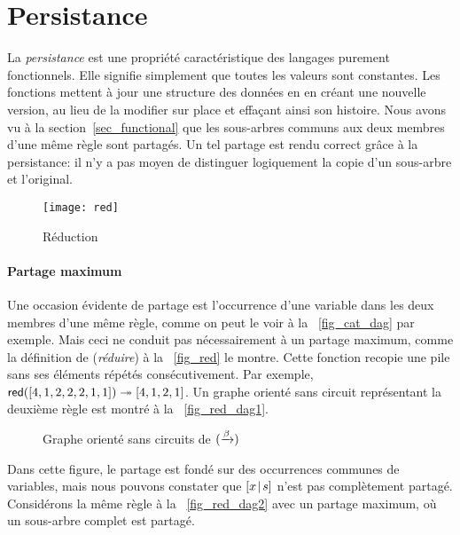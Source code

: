 \section{Persistance}
\label{sec_persistence}

La \emph{persistance} est une propriété
caractéristique des langages purement fonctionnels. Elle signifie
simplement que toutes les valeurs sont constantes. Les fonctions
mettent à jour une structure des données en en créant une nouvelle
version, au lieu de la modifier sur place et effaçant ainsi son
histoire. Nous avons vu à la section~\vref{sec_functional} que les
sous-arbres communs aux deux membres d'une même règle sont partagés.
Un tel partage est rendu correct grâce à la persistance: il n'y a pas
moyen de distinguer logiquement la copie d'un sous-arbre et
l'original.

%
\setlength{\intextsep}{0pt}
\begin{wrapfigure}[6]{r}[0pt]{0pt}
\centering
\texttt{[image: red]}
\caption{Réduction\label{fig_red}}
\end{wrapfigure}

\paragraph{Partage maximum}

Une occasion évidente de partage est l'occurrence d'une variable dans
les deux membres d'une même règle, comme on peut le voir à la
\fig~\vref{fig_cat_dag} par exemple. Mais ceci ne conduit pas
nécessairement à un partage maximum, comme la définition de
 (\emph{réduire}) à la
\fig~\vref{fig_red} le montre. Cette fonction recopie une pile sans
ses éléments répétés consécutivement. Par exemple,
\(\textsf{red}([4,1,2,2,2,1,1]) \twoheadrightarrow [4,1,2,1]\). Un graphe
orienté sans circuit représentant la deuxième règle est montré à la
\fig~\vref{fig_red_dag1}.
\begin{figure}[b]
\centering
{}
\qquad\qquad
{}
\caption{Graphe orienté sans circuits de \((\xrightarrow{\smash{\beta}})\)}
\end{figure}
Dans cette figure, le partage est fondé sur des occurrences communes
de variables, mais nous pouvons constater que \([{x}\!\mid\!{s}]\) n'est
pas complètement partagé. Considérons la même règle à la
\fig~\vref{fig_red_dag2} avec un partage maximum, où un sous-arbre
complet est partagé.

